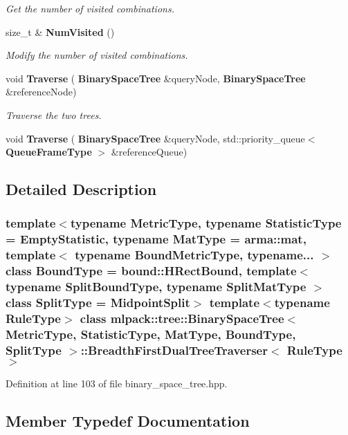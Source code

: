 \begin{DoxyCompactItemize}
\begin{DoxyCompactList}\small\item\em Get the number of visited combinations. \end{DoxyCompactList}\item 
size\+\_\+t \& \textbf{ Num\+Visited} ()
\begin{DoxyCompactList}\small\item\em Modify the number of visited combinations. \end{DoxyCompactList}\item 
void \textbf{ Traverse} (\textbf{ Binary\+Space\+Tree} \&query\+Node, \textbf{ Binary\+Space\+Tree} \&reference\+Node)
\begin{DoxyCompactList}\small\item\em Traverse the two trees. \end{DoxyCompactList}\item 
void \textbf{ Traverse} (\textbf{ Binary\+Space\+Tree} \&query\+Node, std\+::priority\+\_\+queue$<$ \textbf{ Queue\+Frame\+Type} $>$ \&reference\+Queue)
\end{DoxyCompactItemize}


\subsection{Detailed Description}
\subsubsection*{template$<$typename Metric\+Type, typename Statistic\+Type = Empty\+Statistic, typename Mat\+Type = arma\+::mat, template$<$ typename Bound\+Metric\+Type, typename... $>$ class Bound\+Type = bound\+::\+H\+Rect\+Bound, template$<$ typename Split\+Bound\+Type, typename Split\+Mat\+Type $>$ class Split\+Type = Midpoint\+Split$>$\newline
template$<$typename Rule\+Type$>$\newline
class mlpack\+::tree\+::\+Binary\+Space\+Tree$<$ Metric\+Type, Statistic\+Type, Mat\+Type, Bound\+Type, Split\+Type $>$\+::\+Breadth\+First\+Dual\+Tree\+Traverser$<$ Rule\+Type $>$}



Definition at line 103 of file binary\+\_\+space\+\_\+tree.\+hpp.



\subsection{Member Typedef Documentation}
\mbox{\label{classmlpack_1_1tree_1_1BinarySpaceTree_1_1BreadthFirstDualTreeTraverser_a2e1032089e19a4c718b6c13b0b651498}} 
